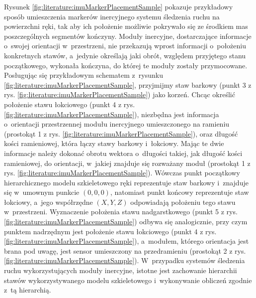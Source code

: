 Rysunek \ref{fig:literature:imuMarkerPlacementSample} pokazuje przykładowy sposób umieszczenia markerów inercyjnego systemu śledzenia ruchu na powierzchni ręki, tak aby ich położenie możliwie pokrywało się ze środkiem mas poszczególnych segmentów kończyny. Moduły inercyjne, dostarczające informacje o~swojej orientacji w~przestrzeni, nie przekazują wprost informacji o~położeniu konkretnych stawów, a~jedynie określają jaki obrót, względem przyjętego stanu początkowego, wykonała kończyna, do której te moduły zostały przymocowane. Posługując się przykładowym schematem z~rysunku \ref{fig:literature:imuMarkerPlacementSample}, przyjmijmy staw barkowy (punkt 3 z rys. \ref{fig:literature:imuMarkerPlacementSample}) jako korzeń. Chcąc określić położenie stawu łokciowego (punkt 4 z rys. \ref{fig:literature:imuMarkerPlacementSample}), niezbędna jest informacja o~orientacji przestrzennej modułu inercyjnego umieszczonego na ramieniu (prostokąt 1 z rys. \ref{fig:literature:imuMarkerPlacementSample}), oraz długość kości ramieniowej, która łączy stawy barkowy i~łokciowy. Mając te dwie informacje należy dokonać obrotu wektora o~długości takiej, jak długość kości ramieniowej, do orientacji, w~jakiej znajduje się rozważany moduł (prostokąt 1 z rys. \ref{fig:literature:imuMarkerPlacementSample}). Wówczas punkt początkowy hierarchicznego modelu szkieletowego ręki reprezentuje staw barkowy i~znajduje się w~umownym punkcie $(0 , 0 , 0)$, natomiast punkt końcowy reprezentuje staw łokciowy, a~jego współrzędne $(X , Y , Z)$ odpowiadają położeniu tego stawu w~przestrzeni. Wyznaczenie położenia stawu nadgarstkowego (punkt 5 z rys. \ref{fig:literature:imuMarkerPlacementSample}) odbywa się analogicznie, przy czym punktem nadrzędnym jest położenie stawu łokciowego (punkt 4 z rys. \ref{fig:literature:imuMarkerPlacementSample}), a~modułem, którego orientacja jest brana pod uwagę, jest sensor umieszczony na przedramieniu (prostokąt 2 z rys. \ref{fig:literature:imuMarkerPlacementSample}). W~przypadku systemów śledzenia ruchu wykorzystujących moduły inercyjne, istotne jest zachowanie hierarchii stawów wykorzystywanego modelu szkieletowego i~wykonywanie obliczeń zgodnie z~tą hierarchią.
																							
